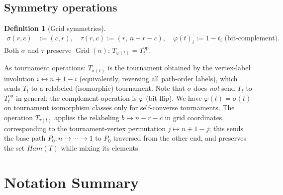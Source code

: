 \documentclass[12pt,reqno]{amsart}
\theoremstyle{plain}
\theoremstyle{definition}
\newtheorem{definition}[theorem]{Definition}
\theoremstyle{remark}
\DeclareMathOperator{\Grid}{Grid}
\newcommand{\Ham}{\mathrm{Ham}}
\newcommand{\op}{\mathrm{op}}
\renewcommand{\Ham}{Ham}%
\begin{document}
\subsection{Symmetry operations}

\begin{definition}[Grid symmetries]\label{def:symmetries}
\begin{align*}
  \sigma(r,c) &:= (c,r), \quad
  \tau(r,c)   := (r,\, n-r-c), \quad
  \varphi(t)_i := 1-t_i \text{ (bit-complement)}.
\end{align*}
Both $\sigma$ and $\tau$ preserve $\Grid(n)$; $T_{\varphi(t)} = T_t^{\op}$.

\smallskip
As tournament operations: $T_{\sigma(t)}$ is the tournament obtained by the
vertex-label involution $i\leftrightarrow n+1-i$ (equivalently, reversing all
path-order labels), which sends $T_t$ to a relabeled (isomorphic) tournament.
Note that $\sigma$ does \emph{not} send $T_t$ to $T_t^{\op}$ in general; the
complement operation is $\varphi$ (bit-flip). We have
$\varphi(t) = \sigma(t)$ on tournament isomorphism classes only for
self-converse tournaments. The operation $T_{\tau(t)}$ applies the
relabeling $b\mapsto n-r-c$ in grid coordinates, corresponding to the
tournament-vertex permutation $j\mapsto n+1-j$; this sends the base path
$P_0\colon n\to\cdots\to 1$ to $P_0$ traversed from the other end, and
preserves the set $\Ham(T)$ while mixing its elements.
\end{definition}

\section*{Notation Summary}
\end{document}
